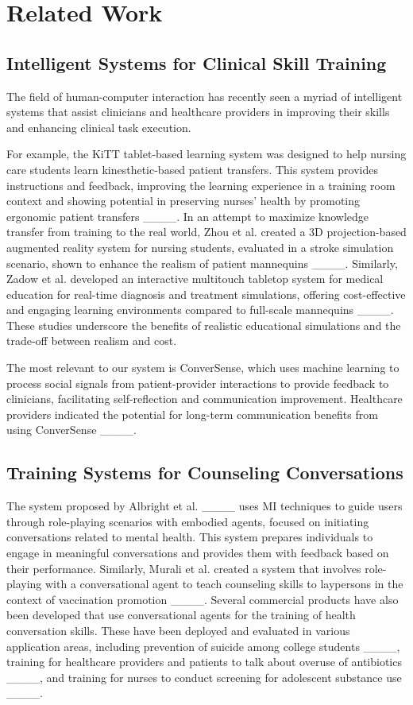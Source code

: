 \section{Related Work}
\subsection{Intelligent Systems for Clinical Skill Training}

The field of human-computer interaction has recently seen a myriad of intelligent systems that assist clinicians and healthcare providers in improving their skills and enhancing clinical task execution. 

For example, the KiTT tablet-based learning system was designed to help nursing care students learn kinesthetic-based patient transfers. This system provides instructions and feedback, improving the learning experience in a training room context and showing potential in preserving nurses' health by promoting ergonomic patient transfers ____. In an attempt to maximize knowledge transfer from training to the real world, Zhou et al. created a 3D projection-based augmented reality system for nursing students, evaluated in a stroke simulation scenario, shown to enhance the realism of patient mannequins ____. Similarly, Zadow et al. developed an interactive multitouch tabletop system for medical education for real-time diagnosis and treatment simulations, offering cost-effective and engaging learning environments compared to full-scale mannequins ____. These studies underscore the benefits of realistic educational simulations and the trade-off between realism and cost.

The most relevant to our system is ConverSense, which uses machine learning to process social signals from patient-provider interactions to provide feedback to clinicians, facilitating self-reflection and communication improvement. Healthcare providers indicated the potential for long-term communication benefits from using ConverSense ____.

\subsection{Training Systems for Counseling Conversations} 
The system proposed by Albright et al. ____ uses MI techniques to guide users through role-playing scenarios with embodied agents, focused on initiating conversations related to mental health. This system prepares individuals to engage in meaningful conversations and provides them with feedback based on their performance.
Similarly, Murali et al. created a system that involves role-playing with a conversational agent to teach counseling skills to laypersons in the context of vaccination promotion ____. Several commercial products have also been developed that use conversational agents for the training of health conversation skills. These have been deployed and evaluated in various application areas, including prevention of suicide among college students ____, training for healthcare providers and patients to talk about overuse of antibiotics ____, and training for nurses to conduct screening for adolescent substance use ____.


